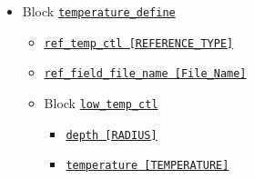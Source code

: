 \begin{itemize}
\begin{itemize}
\begin{itemize}
\begin{itemize}
				{\tt coef\_4\_m\_diffuse\_ctl [Name] [Power]}
			\item Array \hyperref[href_t:coef_4_induction_ctl]
				{\tt coef\_4\_induction\_ctl  [Name] [Power]}
			\end{itemize}
%
		\item Block \hyperref[href_t:composition]{\tt composition}
			\begin{itemize} \label{href_i:composition}
			\item Array \hyperref[href_t:coef_4_composition_ctl]
				{\tt coef\_4\_composition\_ctl         [Name] [Power]}
			\item Array \hyperref[href_t:coef_4_c_diffuse_ctl]
				{\tt coef\_4\_c\_diffuse\_ctl          [Name] [Power]}
			\item Array \hyperref[href_t:coef_4_composition_source_ctl]
				{\tt coef\_4\_composition\_source\_ctl [Name] [Power]}
			\end{itemize}
		\end{itemize}
%
%
%
	\item Block \hyperref[href_t:temperature_define]{\tt temperature\_define}
		\begin{itemize} \label{href_i:temperature_define}
		\item \verb||
				\hyperref[href_t:ref_temp_ctl]{\tt ref\_temp\_ctl        [REFERENCE\_TYPE]}
		\item \verb||
				\hyperref[href_t:ref_field_file_name]{\tt ref\_field\_file\_name [File\_Name]}
		\item Block \hyperref[href_t:low_temp_ctl]{\tt low\_temp\_ctl}
			\begin{itemize}
			\item \hyperref[href_t:depth]      {\tt depth        [RADIUS]}
			\item \hyperref[href_t:temperature]{\tt temperature  [TEMPERATURE]}

\end{itemize}
\end{itemize}
\end{itemize}
\end{itemize}
